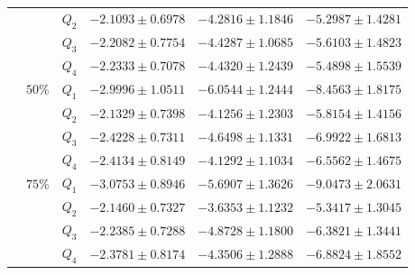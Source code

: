 \begin{table}[h]
{\begin{tabular}{@{}ccclll@{}}
 &  & $Q_{2}$ & $\mathbf{-2.1093 \pm 0.6978}$ & $\mathbf{-4.2816 \pm 1.1846}$ & $\mathbf{-5.2987 \pm 1.4281}$ \\
 &  & $Q_{3}$ & $-2.2082 \pm 0.7754$ & $-4.4287 \pm 1.0685$ & $-5.6103 \pm 1.4823$ \\
 &  & $Q_{4}$ & $-2.2333 \pm 0.7078$ & $-4.4320 \pm 1.2439$ & $-5.4898 \pm 1.5539$ \\ \cmidrule(l){2-6} 
 & $50\%$ & $Q_{1}$ & $-2.9996 \pm 1.0511$ & $-6.0544 \pm 1.2444$ & $-8.4563 \pm 1.8175$ \\
 &  & $Q_{2}$ & $\mathbf{-2.1329 \pm 0.7398}$ & $\mathbf{-4.1256 \pm 1.2303}$ & $\mathbf{-5.8154 \pm 1.4156}$ \\
 &  & $Q_{3}$ & $-2.4228 \pm 0.7311$ & $-4.6498 \pm 1.1331$ & $-6.9922 \pm 1.6813$ \\
 &  & $Q_{4}$ & $-2.4134 \pm 0.8149$ & $-4.1292 \pm 1.1034$ & $-6.5562 \pm 1.4675$ \\ \cmidrule(l){2-6} 
 & $75\%$ & $Q_{1}$ & $-3.0753 \pm 0.8946$ & $-5.6907 \pm 1.3626$ & $-9.0473 \pm 2.0631$ \\
 &  & $Q_{2}$ & $\mathbf{-2.1460 \pm 0.7327}$ & $\mathbf{-3.6353 \pm 1.1232}$ & $\mathbf{-5.3417 \pm 1.3045}$ \\
 &  & $Q_{3}$ & $-2.2385 \pm 0.7288$ & $-4.8728 \pm 1.1800$ & $-6.3821 \pm 1.3441$ \\
 &  & $Q_{4}$ & $-2.3781 \pm 0.8174$ & $-4.3506 \pm 1.2888$ & $-6.8824 \pm 1.8552$ \\ \bottomrule
\end{tabular}%
}
\end{table}

